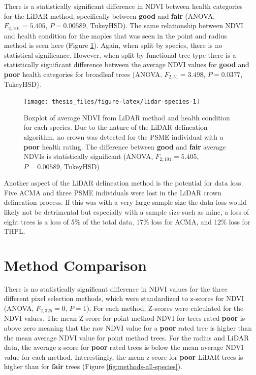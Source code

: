\documentclass[12pt,twoside]{reedthesis}
\begin{document}
There is a statistically significant difference in NDVI between health
categories for the LiDAR method, specifically between \textbf{good} and
\textbf{fair} (ANOVA, \(F_{2,101} = 5.405\), \(P = 0.00589\), TukeyHSD). The same
relationship between NDVI and health condition for the maples that was
seen in the point and radius method is seen here (Figure
\ref{fig:lidar-species}). Again, when split by species, there is no
statistical significance. However, when split by functional tree type
there is a statistically significant difference between the average NDVI
values for \textbf{good} and \textbf{poor} health categories for broadleaf trees
(ANOVA, \(F_{2,51} = 3.498\), \(P = 0.0377\), TukeyHSD).







\begin{figure}[H]

{\centering \texttt{[image: thesis\_files/figure-latex/lidar-species-1]} 

}

\caption[NDVI and health condition for LiDAR method]{Boxplot of average NDVI from LiDAR method and health
condition for each species. Due to the nature of the LiDAR delineation
algorithm, no crown was detected for the PSME individual with a \textbf{poor}
health rating. The difference between \textbf{good} and \textbf{fair} average
NDVIs is statistically significant (ANOVA, \(F_{2,101} = 5.405\),
\(P = 0.00589\), TukeyHSD)}\label{fig:lidar-species}
\end{figure}
Another aspect of the LiDAR delineation method is the potential for data
loss. Five ACMA and three PSME individuals were lost in the LiDAR crown
delineation process. If this was with a very large sample size the data
loss would likely not be detrimental but especially with a sample size
such as mine, a loss of eight trees is a loss of 5\% of the total data,
17\% loss for ACMA, and 12\% loss for THPL.

\hypertarget{method-comparison}{%
\section{Method Comparison}\label{method-comparison}}

There is no statistically significant difference in NDVI values for the
three different pixel selection methods, which were standardized to
z-scores for NDVI (ANOVA, \(F_{2, 325}=0\), \(P = 1\)). For each method,
Z-scores were calculated for the NDVI values. The mean Z-score for point
method NDVI for trees rated \textbf{poor} is above zero meaning that the raw
NDVI value for a \textbf{poor} rated tree is higher than the mean average
NDVI value for point method trees. For the radius and LiDAR data, the
average z-score for \textbf{poor} rated trees is below the mean average NDVI
value for each method. Interestingly, the mean z-score for \textbf{poor}
LiDAR trees is higher than for \textbf{fair} trees (Figure
\ref{fig:methods-all-species}).
\end{document}
